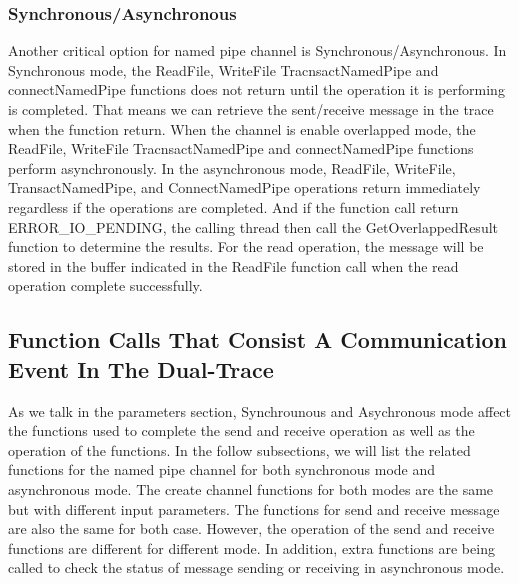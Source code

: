 \subsubsection{Synchronous/Asynchronous}
Another critical option for named pipe channel is Synchronous/Asynchronous. In Synchronous mode, the ReadFile, WriteFile TracnsactNamedPipe and connectNamedPipe functions does not return until the operation it is performing is completed. That means we can retrieve the sent/receive message in the trace when the function return. When the channel is enable overlapped mode, the ReadFile, WriteFile TracnsactNamedPipe and connectNamedPipe functions perform asynchronously. In the asynchronous mode, ReadFile, WriteFile, TransactNamedPipe, and ConnectNamedPipe operations return immediately regardless if the operations are completed. And if the function call return ERROR\_IO\_PENDING, the calling thread then call the GetOverlappedResult function to determine the results. For the read operation, the message will be stored in the buffer indicated in the ReadFile function call when the read operation complete successfully.




\subsection{Function Calls That Consist A Communication Event In The Dual-Trace}
As we talk in the parameters section, Synchrounous and Asychronous mode affect the functions used to complete the send and receive operation as well as the operation of the functions. In the follow subsections, we will list the related functions for the named pipe channel for both synchronous mode and asynchronous mode. The create channel functions for both modes are the same but with different input parameters. The functions for send and receive message are also the same for both case. However, the operation of the send and receive functions are different for different mode. In addition, extra functions are being called to check the status of message sending or receiving in asynchronous mode.
